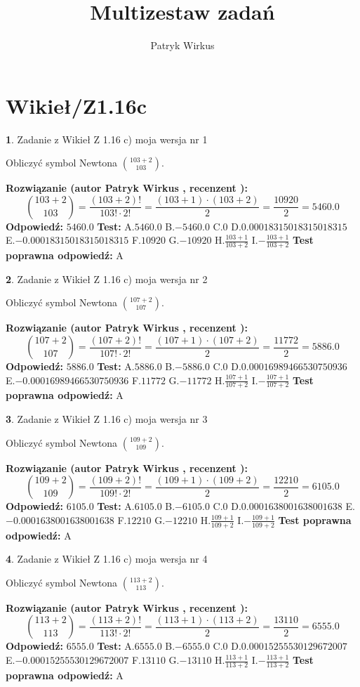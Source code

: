 \documentclass[12pt, a4paper]{article}
\title{Multizestaw zadań}
\author{Patryk Wirkus}
\date{}
\theoremstyle{definition} %
\newtheorem{zad}{}
\newcommand{\kategoria}[1]{\section{#1}}
\newcommand{\zadStart}[1]{\begin{zad}#1\newline}
\newcommand{\zadStop}{\end{zad}}
\newcommand{\rozwStart}[2]{\noindent \textbf{Rozwiązanie (autor #1 , recenzent #2): }\newline}
\newcommand{\rozwStop}{\newline}
\newcommand{\odpStart}{\noindent \textbf{Odpowiedź:}\newline}
\newcommand{\odpStop}{\newline}
\newcommand{\testStart}{\noindent \textbf{Test:}\newline}
\newcommand{\testStop}{\newline}
\newcommand{\kluczStart}{\noindent \textbf{Test poprawna odpowiedź:}\newline}
\newcommand{\kluczStop}{\newline}
\begin{document}
\maketitle

\kategoria{Wikieł/Z1.16c}


\zadStart{Zadanie z Wikieł Z 1.16 c) moja wersja nr 1}

Obliczyć symbol Newtona ${103+2 \choose 103}$.
\zadStop
\rozwStart{Patryk Wirkus}{}
$${103+2 \choose 103} = \frac{(103+2)!}{103! \cdot 2!} = \frac{(103+1)\cdot(103+2)}{2} = \frac{10920}{2} = 5460.0$$
\rozwStop
\odpStart
$5460.0$
\odpStop
\testStart
A.$5460.0$ B.$-5460.0$ C.$0$ D.$0.00018315018315018315$ E.$-0.00018315018315018315$
F.$10920$ G.$-10920$
H.$\frac{103+1}{103+2}$
I.$-\frac{103+1}{103+2}$
\testStop
\kluczStart
A
\kluczStop



\zadStart{Zadanie z Wikieł Z 1.16 c) moja wersja nr 2}

Obliczyć symbol Newtona ${107+2 \choose 107}$.
\zadStop
\rozwStart{Patryk Wirkus}{}
$${107+2 \choose 107} = \frac{(107+2)!}{107! \cdot 2!} = \frac{(107+1)\cdot(107+2)}{2} = \frac{11772}{2} = 5886.0$$
\rozwStop
\odpStart
$5886.0$
\odpStop
\testStart
A.$5886.0$ B.$-5886.0$ C.$0$ D.$0.00016989466530750936$ E.$-0.00016989466530750936$
F.$11772$ G.$-11772$
H.$\frac{107+1}{107+2}$
I.$-\frac{107+1}{107+2}$
\testStop
\kluczStart
A
\kluczStop



\zadStart{Zadanie z Wikieł Z 1.16 c) moja wersja nr 3}

Obliczyć symbol Newtona ${109+2 \choose 109}$.
\zadStop
\rozwStart{Patryk Wirkus}{}
$${109+2 \choose 109} = \frac{(109+2)!}{109! \cdot 2!} = \frac{(109+1)\cdot(109+2)}{2} = \frac{12210}{2} = 6105.0$$
\rozwStop
\odpStart
$6105.0$
\odpStop
\testStart
A.$6105.0$ B.$-6105.0$ C.$0$ D.$0.0001638001638001638$ E.$-0.0001638001638001638$
F.$12210$ G.$-12210$
H.$\frac{109+1}{109+2}$
I.$-\frac{109+1}{109+2}$
\testStop
\kluczStart
A
\kluczStop



\zadStart{Zadanie z Wikieł Z 1.16 c) moja wersja nr 4}

Obliczyć symbol Newtona ${113+2 \choose 113}$.
\zadStop
\rozwStart{Patryk Wirkus}{}
$${113+2 \choose 113} = \frac{(113+2)!}{113! \cdot 2!} = \frac{(113+1)\cdot(113+2)}{2} = \frac{13110}{2} = 6555.0$$
\rozwStop
\odpStart
$6555.0$
\odpStop
\testStart
A.$6555.0$ B.$-6555.0$ C.$0$ D.$0.00015255530129672007$ E.$-0.00015255530129672007$
F.$13110$ G.$-13110$
H.$\frac{113+1}{113+2}$
I.$-\frac{113+1}{113+2}$
\testStop
\kluczStart
A
\kluczStop
\end{document}
